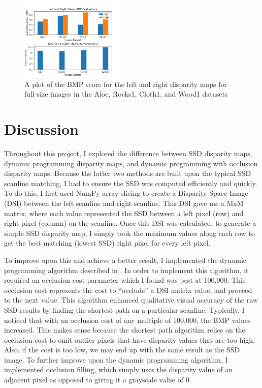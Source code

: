 \documentclass[11pt,a4paper]{article}
\begin{document}
\begin{figure}
  \centering
  \includegraphics[width=0.45\textwidth]{figures/full_plots.png}
  \caption{A plot of the BMP score for the left and right disparity maps for full-size images in the Aloe, Rocks1, Cloth1, and Wood1 datasets}
  \label{fig:plots}
\end{figure}



\section{Discussion}

Throughout this project, I explored the difference between SSD disparity maps, dynamic programming disparity maps, 
 and dynamic programming with occlusion disparity maps. Because the latter two methods are built upon the typical SSD 
 scanline matching, I had to ensure the SSD was computed efficiently and quickly. To do this, I first used NumPy array 
 slicing to create a Disparity Space Image (DSI) between the left scanline and right scanline. This DSI gave me a MxM matrix, 
 where each value represented the SSD between a left pixel (row) and right pixel (column) on the scanline. Once this DSI was calculated, 
 to generate a simple SSD disparity map, I simply took the maximum values along each row to get the best matching (lowest SSD) 
 right pixel for every left pixel. 

To improve upon this and achieve a better result, I implemented the dynamic programming algorithm described in \cite{COX1996542}. 
 In order to implement this algorithm, it required an occlusion cost parameter which I found was best at 100,000. This occlusion 
 cost represents the cost to “occlude” a DSI matrix value, and proceed to the next value. This algorithm enhanced qualitative visual 
 accuracy of the raw SSD results by finding the shortest path on a particular scanline. Typically, I noticed that with an occlusion cost of any multiple of 100,000, 
 the BMP values increased. This makes sense because the shortest path algorithm relies on the occlusion cost to omit outlier pixels that have disparity values that 
 are too high. Also, if the cost is too low, we may end up with the same result as the SSD image. To further improve upon the dynamic programming algorithm, I implemented occlusion filling, which simply uses the disparity
 value of an adjacent pixel as opposed to giving it a grayscale value of 0. 
 
\end{document}
